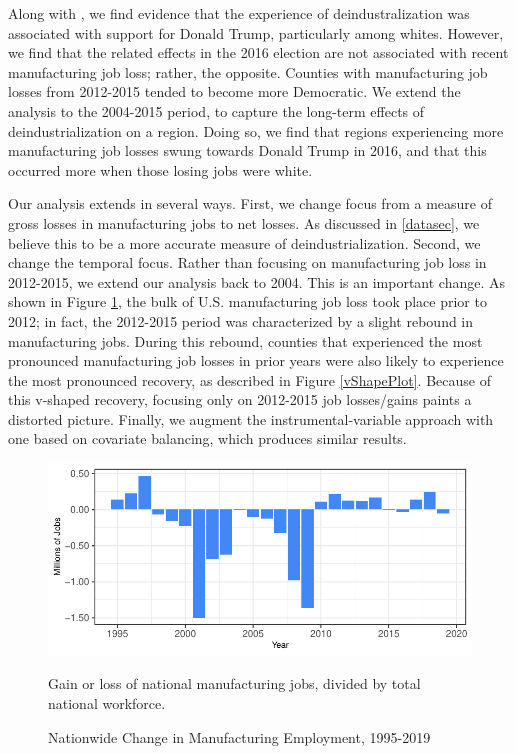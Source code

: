 \documentclass[]{AEA}
\begin{document}
Along with \cite{Baccini21}, we find evidence that the experience of
deindustralization was associated with support for Donald Trump,
particularly among whites. However, we find that the related effects in
the 2016 election are not associated with recent manufacturing job loss;
rather, the opposite. Counties with manufacturing job losses from
2012-2015 tended to become more Democratic. We extend the analysis to
the 2004-2015 period, to capture the long-term effects of
deindustrialization on a region. Doing so, we find that regions
experiencing more manufacturing job losses swung towards Donald Trump in
2016, and that this occurred more when those losing jobs were white.

Our analysis extends \cite{Baccini21} in several ways. First, we change
focus from a measure of gross losses in manufacturing jobs to net
losses. As discussed in \ref{datasec}, we believe this to be a more
accurate measure of deindustrialization. Second, we change the temporal
focus. Rather than focusing on manufacturing job loss in 2012-2015, we
extend our analysis back to 2004. This is an important change. As shown
in Figure \ref{natlPlot}, the bulk of U.S. manufacturing job loss took
place prior to 2012; in fact, the 2012-2015 period was characterized by
a slight rebound in manufacturing jobs. During this rebound, counties
that experienced the most pronounced manufacturing job losses in prior
years were also likely to experience the most pronounced recovery, as
described in Figure \ref{vShapePlot}. Because of this v-shaped recovery,
focusing only on 2012-2015 job losses/gains paints a distorted picture.
Finally, we augment the instrumental-variable approach with one based on
covariate balancing, which produces similar results.

\begin{figure} \label{natlPlot}
\caption{Nationwide Change in Manufacturing Employment, 1995-2019}

\begin{center}\includegraphics{Final-Draft_files/figure-latex/unnamed-chunk-2-1} \end{center}

\begin{figurenotes}
Gain or loss of national manufacturing jobs, divided by total national workforce.
\end{figurenotes}
\end{figure}
\end{document}
